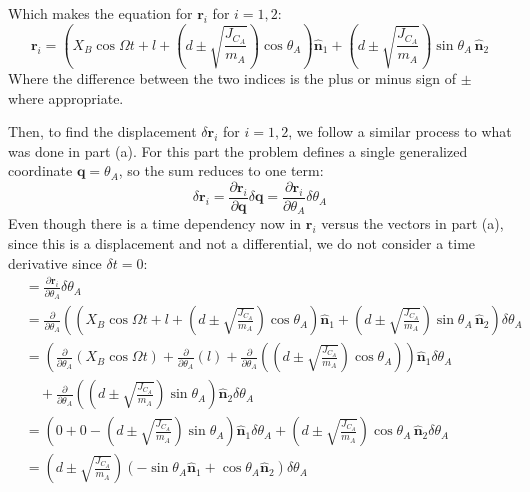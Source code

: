 \documentclass[titlepage]{article}
\begin{document}
\begin{mdframed}[linewidth=1pt, innertopmargin=10pt, innerbottommargin=10pt]
	Which makes the equation for $\boldsymbol{r}_i$ for $i=1,2$:
	\begin{equation}
		\boldsymbol{r}_i=\left(X_B\cos\Omega t+l+\left(d\pm\sqrt{\frac{J_{C_A}}{m_A}}\right)\cos\theta_A\right)\hat{\boldsymbol{n}}_1+\left(d\pm\sqrt{\frac{J_{C_A}}{m_A}}\right)\sin\theta_A\,\hat{\boldsymbol{n}}_2
	\end{equation}
	Where the difference between the two indices is the plus or minus sign of $\pm$ where appropriate.
\end{mdframed}

Then, to find the displacement $\delta\boldsymbol{r}_i$ for $i=1,2$, we follow a similar process to what was done in part (a). For this part the problem defines a single generalized coordinate $\boldsymbol{q}=\theta_A$, so the sum reduces to one term:
\begin{equation}
	\delta\boldsymbol{r}_i=\frac{\partial\boldsymbol{r}_i}{\partial\boldsymbol{q}}\delta\boldsymbol{q}=\frac{\partial\boldsymbol{r}_i}{\partial\theta_A}\delta\theta_A
\end{equation}
Even though there is a time dependency now in $\boldsymbol{r}_i$ versus the vectors in part (a), since this is a displacement and not a differential, we do not consider a time derivative since $\delta t=0$:
\begin{equation}
	\begin{split}
		&=\frac{\partial\boldsymbol{r}_i}{\partial\theta_A}\delta\theta_A\\
		&=\frac{\partial}{\partial\theta_A}\left(\left(X_B\cos\Omega t+l+\left(d\pm\sqrt{\frac{J_{C_A}}{m_A}}\right)\cos\theta_A\right)\hat{\boldsymbol{n}}_1+\left(d\pm\sqrt{\frac{J_{C_A}}{m_A}}\right)\sin\theta_A\,\hat{\boldsymbol{n}}_2\right)\delta\theta_A \\
		&=\left(\frac{\partial}{\partial\theta_A}\left(X_B\cos\Omega t\right)+\frac{\partial}{\partial\theta_A}\left(l\right)+\frac{\partial}{\partial\theta_A}\left(\left(d\pm\sqrt{\frac{J_{C_A}}{m_A}}\right)\cos\theta_A\right)\right)\hat{\boldsymbol{n}}_1\delta\theta_A \\
		&\quad+\frac{\partial}{\partial\theta_A}\left(\left(d\pm\sqrt{\frac{J_{C_A}}{m_A}}\right)\sin\theta_A\right)\hat{\boldsymbol{n}}_2\delta\theta_A \\
		&=\left(0+0-\left(d\pm\sqrt{\frac{J_{C_A}}{m_A}}\right)\sin\theta_A\right)\hat{\boldsymbol{n}}_1\delta\theta_A+\left(d\pm\sqrt{\frac{J_{C_A}}{m_A}}\right)\cos\theta_A\,\hat{\boldsymbol{n}}_2\delta\theta_A \\
		&=\left(d\pm\sqrt{\frac{J_{C_A}}{m_A}}\right)\left(-\sin\theta_A\hat{\boldsymbol{n}}_1+\cos\theta_A\hat{\boldsymbol{n}}_2\right)\delta\theta_A
	\end{split}
\end{equation}
\end{document}
